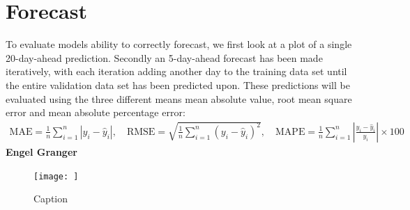 \section{Forecast}
To evaluate models ability to correctly forecast, we first look at a plot of a single 20-day-ahead prediction. Secondly an 5-day-ahead forecast has been made iteratively, with each iteration adding another day to the training data set until the entire validation data set has been predicted upon. These predictions will be evaluated using the three different means mean absolute value, root mean square error and mean absolute percentage error:
\begin{align*}
    \text{MAE} = \frac{1}{n} \sum_{i=1}^{n} |y_i - \hat{y}_i|, \quad \text{RMSE} = \sqrt{\frac{1}{n} \sum_{i=1}^{n} (y_i - \hat{y}_i)^2}, \quad \text{MAPE} = \frac{1}{n} \sum_{i=1}^{n} \left| \frac{y_i - \hat{y}_i}{y_i} \right| \times 100
\end{align*}
\textbf{Engel Granger}

\begin{figure}
    \centering
    \texttt{[image: ]}
    \caption{Caption}
    \label{fig:enter-label}
\end{figure}